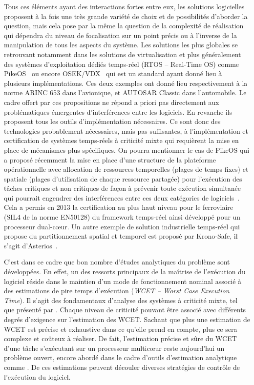 \documentclass[french, a4paper, 11pt, twoside, pdftex]{StyleThese}
\begin{document}
	Tous ces éléments ayant des interactions fortes entre eux, les solutions logicielles proposent à la fois une très grande variété de choix et de possibilités d'aborder la question, mais cela pose par la même la question de la complexité de réalisation qui dépendra du niveau de focalisation sur un point précis ou à l'inverse de la manipulation de tous les aspects du système. Les solutions les plus globales se retrouvant notamment dans les solutions de virtualisation \cite{augier_real-time_2006} et plus généralement des systèmes d'exploitation dédiés temps-réel (RTOS -- Real-Time OS) comme PikeOS~\cite{kaiser_evolution_2007} ou encore OSEK/VDX~\cite{bechennec_trampoline_2006} qui est un standard ayant donné lieu à plusieurs implémentations. Ces deux exemples ont donné lieu respectivement à la norme ARINC 653 dans l'avionique, et AUTOSAR Classic dans l'automobile. Le cadre offert par ces propositions ne répond a priori pas directement aux problématiques émergentes d'interférences entre les logiciels. En revanche ils proposent tous les outils d'implémentation nécessaires. Ce sont donc des technologies probablement nécessaires, mais pas suffisantes, à l'implémentation et certification de systèmes temps-réels à criticité mixte qui requièrent la mise en place de mécanismes plus spécifiques. On pourra mentionner le cas de PikeOS qui a proposé récemment la mise en place d'une structure de la plateforme opérationnelle avec allocation de ressources temporelles (plages de temps fixes) et spatiale (plages d'utilisation de chaque ressource partagée) pour l'exécution des tâches critiques et non critiques de façon à prévenir toute exécution simultanée qui pourrait engendrer des interférences entre ces deux catégories de logiciels~\cite{sysgo_ag_arinc_2019}. Cela a permis en 2013 la certification au plus haut niveau pour le ferroviaire (SIL4 de la norme EN50128)  du framework temps-réel ainsi développé pour un processeur dual-cœur. Un autre exemple de solution industrielle temps-réel qui propose du partitionnement spatial et temporel est proposé par Krono-Safe, il s'agit d'Asterios~\cite{krono-asterios-2017}. 
		
	C'est dans ce cadre que bon nombre d'études analytiques du problème sont développées. En effet, un des ressorts principaux de la maîtrise de l'exécution du logiciel réside dans le maintien d'un mode de fonctionnement nominal associé à des estimations de pire temps d'exécution (\textit{WCET -- Worst Case Execution Time}). Il s'agit des fondamentaux d'analyse des systèmes à criticité mixte, tel que présenté par \cite{vestal_preemptive_2007}. Chaque niveau de criticité pouvant être associé avec différents degrés d'exigence sur l'estimation des WCET. Sachant que plus une estimation de WCET est précise et exhaustive dans ce qu'elle prend en compte, plus ce sera complexe et coûteux à réaliser. De fait, l'estimation précise et sûre du WCET d'une tâche s'exécutant sur un processeur multicœur reste aujourd'hui un problème ouvert, encore abordé dans le cadre d'outils d'estimation analytique comme \cite{kastner_timeweaver_2019}. De ces estimations peuvent découler diverses stratégies de contrôle de l'exécution du logiciel.
	
\end{document}
